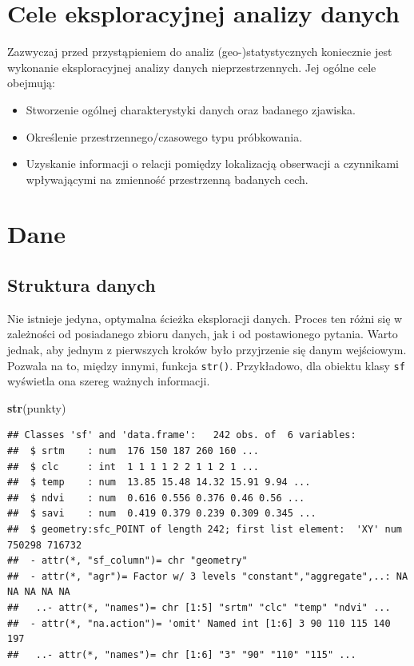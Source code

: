 \documentclass[
  paper=6in:9in,pagesize=pdftex,headinclude=on,footinclude=on,10pt]{scrbook}
\newenvironment{Shaded}{\begin{snugshade}}{\end{snugshade}}
\newcommand{\FunctionTok}[1]{\textcolor[rgb]{0.13,0.29,0.53}{\textbf{#1}}}
\newcommand{\NormalTok}[1]{#1}
\providecommand{\tightlist}{%
  \setlength{\itemsep}{0pt}\setlength{\parskip}{0pt}}
\begin{document}
\section{Cele eksploracyjnej analizy danych}\label{cele-eksploracyjnej-analizy-danych}

Zazwyczaj przed przystąpieniem do analiz (geo-)statystycznych koniecznie jest wykonanie eksploracyjnej analizy danych nieprzestrzennych.
Jej ogólne cele obejmują:

\begin{itemize}
\tightlist
\item
  Stworzenie ogólnej charakterystyki danych oraz badanego zjawiska.
\item
  Określenie przestrzennego/czasowego typu próbkowania.
\item
  Uzyskanie informacji o relacji pomiędzy lokalizacją obserwacji a czynnikami wpływającymi na zmienność przestrzenną badanych cech.
\end{itemize}

\section{Dane}\label{dane-1}

\subsection{Struktura danych}\label{struktura-danych}

Nie istnieje jedyna, optymalna ścieżka eksploracji danych.
Proces ten różni się w zależności od posiadanego zbioru danych, jak i od postawionego pytania.
Warto jednak, aby jednym z pierwszych kroków było przyjrzenie się danym wejściowym.
Pozwala na to, między innymi, funkcja \texttt{str()}.
Przykładowo, dla obiektu klasy \texttt{sf} wyświetla ona szereg ważnych informacji.

\begin{Shaded}
\begin{Highlighting}[]
\FunctionTok{str}\NormalTok{(punkty)}
\end{Highlighting}
\end{Shaded}

\begin{verbatim}
## Classes 'sf' and 'data.frame':   242 obs. of  6 variables:
##  $ srtm    : num  176 150 187 260 160 ...
##  $ clc     : int  1 1 1 1 2 2 1 1 2 1 ...
##  $ temp    : num  13.85 15.48 14.32 15.91 9.94 ...
##  $ ndvi    : num  0.616 0.556 0.376 0.46 0.56 ...
##  $ savi    : num  0.419 0.379 0.239 0.309 0.345 ...
##  $ geometry:sfc_POINT of length 242; first list element:  'XY' num  750298 716732
##  - attr(*, "sf_column")= chr "geometry"
##  - attr(*, "agr")= Factor w/ 3 levels "constant","aggregate",..: NA NA NA NA NA
##   ..- attr(*, "names")= chr [1:5] "srtm" "clc" "temp" "ndvi" ...
##  - attr(*, "na.action")= 'omit' Named int [1:6] 3 90 110 115 140 197
##   ..- attr(*, "names")= chr [1:6] "3" "90" "110" "115" ...
\end{verbatim}
\end{document}
